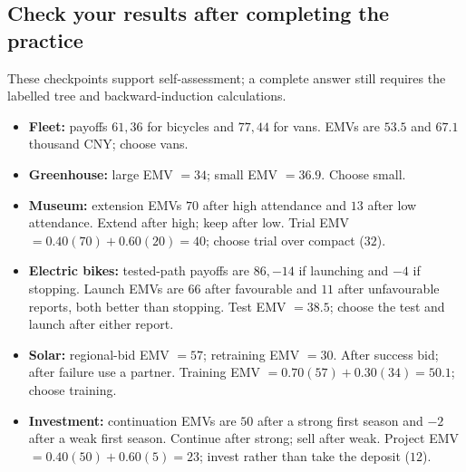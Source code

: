 \subsection*{Check your results after completing the practice}
These checkpoints support self-assessment; a complete answer still requires the labelled tree and backward-induction calculations.
\begin{itemize}
\item \textbf{Fleet:} payoffs $61,36$ for bicycles and $77,44$ for vans. EMVs are $53.5$ and $67.1$ thousand CNY; choose vans.
\item \textbf{Greenhouse:} large EMV $=34$; small EMV $=36.9$. Choose small.
\item \textbf{Museum:} extension EMVs $70$ after high attendance and $13$ after low attendance. Extend after high; keep after low. Trial EMV $=0.40(70)+0.60(20)=40$; choose trial over compact ($32$).
\item \textbf{Electric bikes:} tested-path payoffs are $86,-14$ if launching and $-4$ if stopping. Launch EMVs are $66$ after favourable and $11$ after unfavourable reports, both better than stopping. Test EMV $=38.5$; choose the test and launch after either report.
\item \textbf{Solar:} regional-bid EMV $=57$; retraining EMV $=30$. After success bid; after failure use a partner. Training EMV $=0.70(57)+0.30(34)=50.1$; choose training.
\item \textbf{Investment:} continuation EMVs are $50$ after a strong first season and $-2$ after a weak first season. Continue after strong; sell after weak. Project EMV $=0.40(50)+0.60(5)=23$; invest rather than take the deposit ($12$).
\end{itemize}

